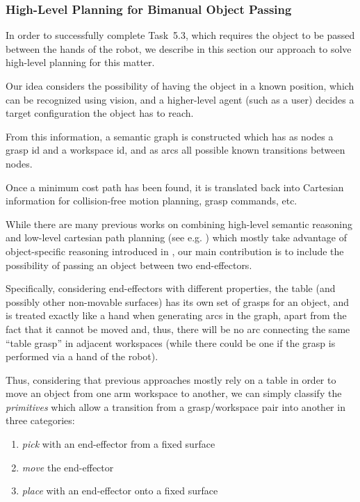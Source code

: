 
\subsubsection{High-Level Planning for Bimanual Object Passing}
\label{sec:HighLevelPlanningDualArm}

In order to successfully complete Task~5.3, which requires the object to be passed between the hands of the robot, we describe in this section our approach to solve high-level planning for this matter.

Our idea considers the possibility of having the object in a known position, which can be recognized using vision, and a higher-level agent (such as a user) decides a target configuration the object has to reach.

From this information, a semantic graph is constructed which has as nodes a grasp id and a workspace id, and as arcs all possible known transitions between nodes.

Once a minimum cost path has been found, it is translated back into Cartesian information for collision-free motion planning, grasp commands, etc.

While there are many previous works on combining high-level semantic reasoning and low-level cartesian path planning (see e.g. \cite{karlsson2012combining, leidner2012things, leidner2013hybrid}) which mostly take advantage of object-specific reasoning introduced in \cite{levison1996connecting}, our main contribution is to include the possibility of passing an object between two end-effectors.

Specifically, considering end-effectors with different properties, the table (and possibly other non-movable surfaces) has its own set of grasps for an object, and is treated exactly like a hand when generating arcs in the graph, apart from the fact that it cannot be moved and, thus, there will be no arc connecting the same ``table grasp'' in adjacent workspaces (while there could be one if the grasp is performed via a hand of the robot).

Thus, considering that previous approaches mostly rely on a table in order to move an object from one arm workspace to another, we can simply classify the \emph{primitives} which allow a transition from a grasp/workspace pair into another in three categories:
\begin{enumerate}
	\item \emph{pick} with an end-effector from a fixed surface
	\item \emph{move} the end-effector
	\item \emph{place} with an end-effector onto a fixed surface
\end{enumerate}

